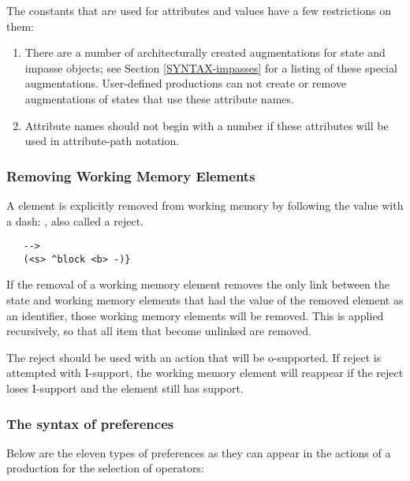 The constants that are used for attributes and values have a few
restrictions on them:\vspace{-12pt} 
\begin{enumerate}
\item There are a number of architecturally created augmentations for state
        and impasse objects; see Section \ref{SYNTAX-impasses} for a listing of 
        these special augmentations. User-defined productions can not create
        or remove augmentations of states that use these
        attribute names.\vspace{-8pt}
\item Attribute names should not begin with a number if these attributes will
        be used in attribute-path notation.
\end{enumerate}

\subsubsection{Removing Working Memory Elements}

A element is explicitly removed from working memory by following the
value with a dash: \soar{-}, also called a reject.  

\begin{verbatim}
   -->
   (<s> ^block <b> -)}
\end{verbatim}

If the removal of a working memory element removes the only link between
the state and working memory elements that had the value of the removed
element as an identifier, those working memory elements will be
removed. This is applied recursively, so that all item that become
unlinked are removed.

The reject should be used with an action that will be o-supported.
If reject is attempted with I-support, the working memory element will
reappear if the reject loses I-support and the element still has
support.  

\subsubsection{The syntax of preferences}

Below are the eleven types of preferences as they can appear in the actions of a
production for the selection of operators:
\label{pref-list}

